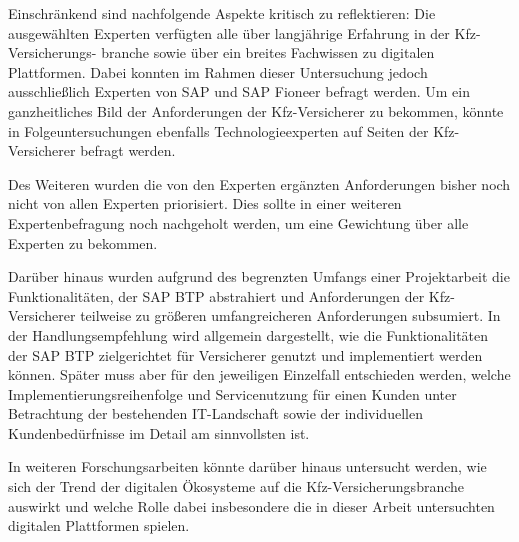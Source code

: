 Einschränkend sind nachfolgende Aspekte kritisch zu reflektieren: Die ausgewählten Experten verfügten alle über langjährige Erfahrung in der Kfz-Versicherungs- branche sowie über ein breites Fachwissen zu digitalen Plattformen. Dabei konnten im Rahmen dieser Untersuchung jedoch ausschließlich Experten von SAP und SAP Fioneer befragt werden. Um ein ganzheitliches Bild der Anforderungen der Kfz-Versicherer zu bekommen, könnte in Folgeuntersuchungen ebenfalls Technologieexperten auf Seiten der Kfz-Versicherer befragt werden. 

Des Weiteren wurden die von den Experten ergänzten Anforderungen bisher noch nicht von allen Experten priorisiert. Dies sollte in einer weiteren Expertenbefragung noch nachgeholt werden, um eine Gewichtung über alle Experten zu bekommen. 


Darüber hinaus wurden aufgrund des begrenzten Umfangs einer Projektarbeit die Funktionalitäten, der SAP BTP abstrahiert und Anforderungen der Kfz-Versicherer teilweise zu größeren umfangreicheren Anforderungen subsumiert. In der Handlungsempfehlung wird allgemein dargestellt, wie die Funktionalitäten der SAP BTP zielgerichtet für Versicherer genutzt und implementiert werden können. Später muss aber für den jeweiligen Einzelfall entschieden werden, welche Implementierungsreihenfolge und Servicenutzung für einen Kunden unter Betrachtung der bestehenden IT-Landschaft sowie der individuellen Kundenbedürfnisse im Detail am sinnvollsten ist.

In weiteren Forschungsarbeiten könnte darüber hinaus untersucht werden, wie sich der Trend der digitalen Ökosysteme auf die Kfz-Versicherungsbranche auswirkt und welche Rolle dabei insbesondere die in dieser Arbeit untersuchten digitalen Plattformen spielen.


